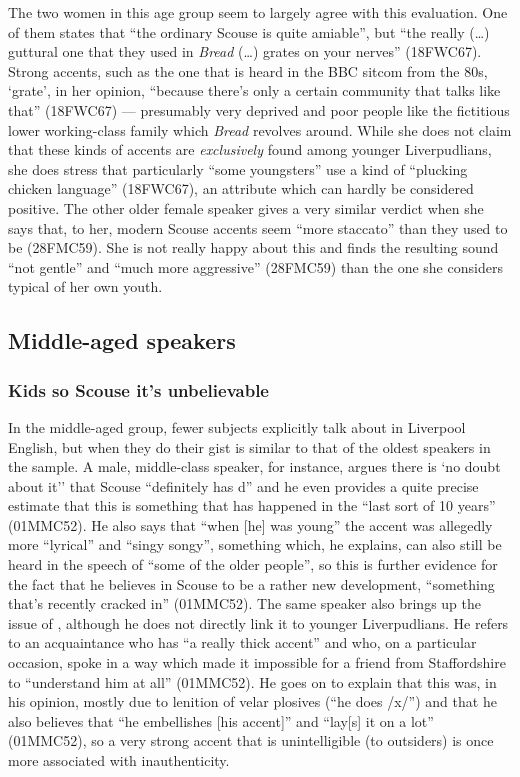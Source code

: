 The two women in this age group seem to largely agree with this evaluation.
One of them states that ``the ordinary Scouse is quite amiable'', but ``the really (\ldots) guttural one that they used in \emph{Bread} (\ldots) grates on your nerves'' (18FWC67).
Strong accents, such as the one that is heard in the BBC sitcom from the 80s, `grate', in her opinion, ``because there's only a certain community that talks like that'' (18FWC67) --- presumably very deprived and poor people like the fictitious lower working-class family which \emph{Bread} revolves around.
While she does not claim that these kinds of accents are \emph{exclusively} found among younger Liverpudlians, she does stress that particularly ``some youngsters'' use a kind of ``plucking chicken language'' (18FWC67), an attribute which can hardly be considered positive.
The other older female speaker gives a very similar verdict when she says that, to her, modern Scouse accents seem ``more staccato'' than they used to be (28FMC59).
She is not really happy about this and finds the resulting sound ``not gentle'' and ``much more aggressive'' (28FMC59) than the one she considers typical of her own youth.

\subsection{Middle-aged speakers}
\label{aware_res.eval.mid}

\subsubsection{Kids so Scouse it's unbelievable}
\label{aware_res.eval.mid.change}

In the middle-aged group, fewer subjects explicitly talk about  in Liverpool English, but when they do their gist is similar to that of the oldest speakers in the sample.
A male, middle-class speaker, for instance, argues there is `no doubt about it'' that Scouse ``definitely has d'' and he even provides a quite precise estimate that this is something that has happened in the ``last sort of 10 years'' (01MMC52).
He also says that ``when [he] was young'' the accent was allegedly more ``lyrical'' and ``singy songy'', something which, he explains, can also still be heard in the speech of ``some of the older people'', so this is further evidence for the fact that he believes  in Scouse to be a rather new development, ``something that's recently cracked in'' (01MMC52).
The same speaker also brings up the issue of , although he does not directly link it to younger Liverpudlians.
He refers to an acquaintance who has ``a really thick accent'' and who, on a particular occasion, spoke in a way which made it impossible for a friend from Staffordshire to ``understand him at all'' (01MMC52).
He goes on to explain that this was, in his opinion, mostly due to lenition of velar plosives (``he does /x/'') and that he also believes that ``he embellishes [his accent]'' and ``lay[s] it on a lot'' (01MMC52), so a very strong accent that is unintelligible (to outsiders) is once more associated with inauthenticity.

